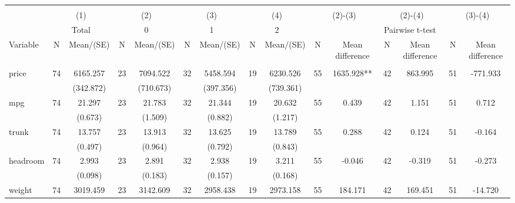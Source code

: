 
\begin{tabular}{@{\extracolsep{5pt}}lcccccccccccccc}
\\[-1.8ex]\hline \hline \\[-1.8ex]
 & \multicolumn{2}{c}{(1)}  & \multicolumn{2}{c}{(2)}  & \multicolumn{2}{c}{(3)}  & \multicolumn{2}{c}{(4)}  & \multicolumn{2}{c}{(2)-(3)} & \multicolumn{2}{c}{(2)-(4)} & \multicolumn{2}{c}{(3)-(4)} \\
 & \multicolumn{2}{c}{Total}  & \multicolumn{2}{c}{0}  & \multicolumn{2}{c}{1}  & \multicolumn{2}{c}{2}  & \multicolumn{6}{c}{Pairwise t-test}  \\
Variable & N & Mean/(SE) & N & Mean/(SE) & N & Mean/(SE) & N & Mean/(SE) & N & Mean difference & N & Mean difference & N & Mean difference \\ \hline \\[-1.8ex] 
price   & 74    & 6165.257    & 23    & 7094.522    & 32    & 5458.594    & 19    & 6230.526    & 55    & 1635.928**    & 42    & 863.995    & 51    & -771.933   \\
 &   & (342.872)  &   & (710.673)  &   & (397.356)  &   & (739.361)  &   &  &   &  &   &  \\ [1ex]
mpg   & 74    & 21.297    & 23    & 21.783    & 32    & 21.344    & 19    & 20.632    & 55    & 0.439    & 42    & 1.151    & 51    & 0.712   \\
 &   & (0.673)  &   & (1.509)  &   & (0.882)  &   & (1.217)  &   &  &   &  &   &  \\ [1ex]
trunk   & 74    & 13.757    & 23    & 13.913    & 32    & 13.625    & 19    & 13.789    & 55    & 0.288    & 42    & 0.124    & 51    & -0.164   \\
 &   & (0.497)  &   & (0.964)  &   & (0.792)  &   & (0.843)  &   &  &   &  &   &  \\ [1ex]
headroom   & 74    & 2.993    & 23    & 2.891    & 32    & 2.938    & 19    & 3.211    & 55    & -0.046    & 42    & -0.319    & 51    & -0.273   \\
 &   & (0.098)  &   & (0.183)  &   & (0.157)  &   & (0.168)  &   &  &   &  &   &  \\ [1ex]
weight   & 74    & 3019.459    & 23    & 3142.609    & 32    & 2958.438    & 19    & 2973.158    & 55    & 184.171    & 42    & 169.451    & 51    & -14.720   \\

\end{tabular}
